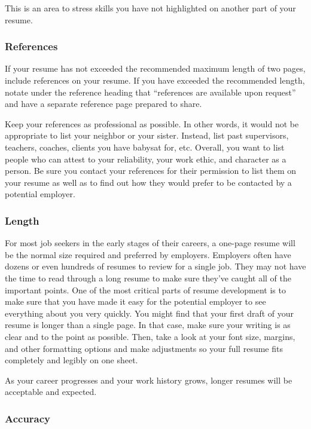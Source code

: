 This is an area to stress skills you have not highlighted on another part of your resume.

\subsubsection*{References}

If your resume has not exceeded the recommended maximum length of two pages, include references on your resume. If you have exceeded the recommended length, notate under the reference heading that ``references are available upon request'' and have a separate reference page prepared to share.

Keep your references as professional as possible. In other words, it would not be appropriate to list your neighbor or your sister. Instead, list past supervisors, teachers, coaches, clients you have babysat for, etc. Overall, you want to list people who can attest to your reliability, your work ethic, and character as a person. Be sure you contact your references for their permission to list them on your resume as well as to find out how they would prefer to be contacted by a potential employer.

\subsubsection*{Length}

For most job seekers in the early stages of their careers, a one-page resume will be the normal size required and preferred by employers. Employers often have dozens or even hundreds of resumes to review for a single job. They may not have the time to read through a long resume to make sure they've caught all of the important points.
One of the most critical parts of resume development is to make sure that you have made it easy for the potential employer to see everything about you very quickly. You might find that your first draft of your resume is longer than a single page. In that case, make sure your writing is as clear and to the point as possible. Then, take a look at your font size, margins, and other formatting options and make adjustments so your full resume fits completely and legibly on one sheet.

As your career progresses and your work history grows, longer resumes will be acceptable and expected.

\subsubsection*{Accuracy}

